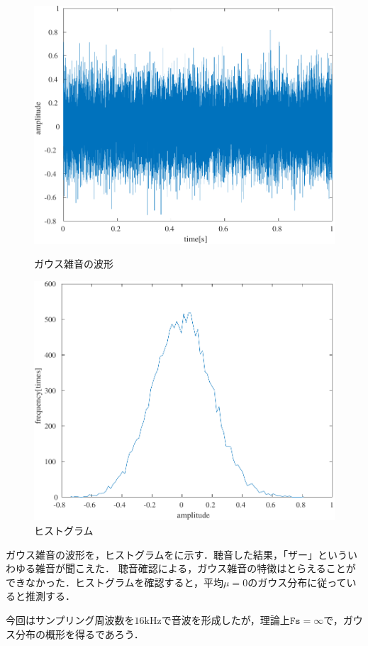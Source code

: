 \begin{figure}
    \centering
    \includegraphics[keepaspectratio,width=.2\textwidth]{../../Figures/01_05_0.pdf}
    \caption{ガウス雑音の波形}
    \label{fig:ガウス雑音の波形}
    \vspace{1em}
    \includegraphics[keepaspectratio,width=.2\textwidth]{../../Figures/01_05_1.pdf}
    \caption{ヒストグラム}
    \label{fig:ヒストグラム}
\end{figure}
\result
ガウス雑音の波形を，ヒストグラムをに示す．聴音した結果，「ザー」といういわゆる雑音が聞こえた．
\consideration
聴音確認による，ガウス雑音の特徴はとらえることができなかった．ヒストグラムを確認すると，平均\(\mu=0\)のガウス分布に従っていると推測する．\par
今回はサンプリング周波数を\(16\textrm{kHz}\)で音波を形成したが，理論上\(\texttt{Fs}=\infty\)で，ガウス分布の概形を得るであろう．